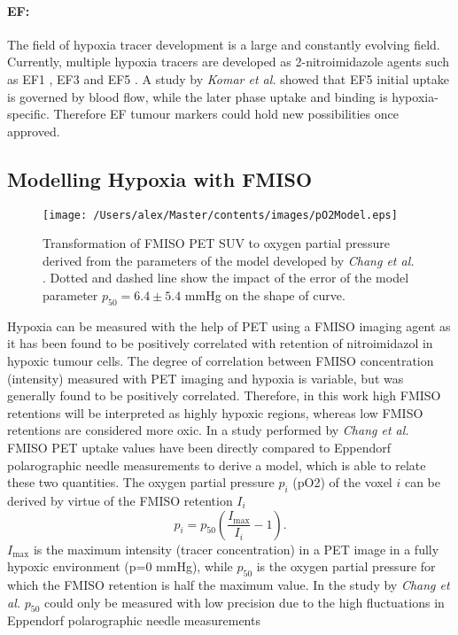 \paragraph{EF: }The field of hypoxia tracer development is a large and constantly evolving field. Currently, multiple hypoxia tracers are developed as 2-nitroimidazole agents such as EF1 \cite{pmid10688119}, EF3 \cite{pmid17334763} and EF5 \cite{pmid12552344}. A study by \textit{Komar et al.} \cite{pmid18997048} showed that EF5 initial uptake is governed by blood flow, while the later phase uptake and binding is hypoxia-specific. Therefore EF tumour markers could hold new possibilities once approved.
\subsection{Modelling Hypoxia with FMISO}
\begin{figure}[htb]
\centering
\texttt{[image: /Users/alex/Master/contents/images/pO2Model.eps]}
\vspace{1cm}
\caption{Transformation of FMISO PET SUV to oxygen partial pressure derived from the parameters of the model developed by \textit{Chang et al.}\cite{pmid19994538} . Dotted and dashed line show the impact of the error of the model parameter $p_{50} = 6.4 \pm 5.4$ mmHg on the shape of curve.}
\label{fig:pO2Model}
\end{figure}
Hypoxia can be measured with the help of PET using a FMISO imaging agent as it has been found to be positively correlated with retention of nitroimidazol in hypoxic tumour cells. The degree of correlation between FMISO concentration (intensity) measured with PET imaging and hypoxia is variable, but was generally found to be positively correlated. Therefore, in this work high FMISO retentions will be interpreted as highly hypoxic regions, whereas low FMISO retentions are considered more oxic. In a study performed by \textit{Chang et al.} \cite{pmid19994538} FMISO PET uptake values have been directly compared to Eppendorf polarographic needle measurements to derive a model, which is able to relate these two quantities. The oxygen partial pressure $p_i$ (pO2) of the voxel $i$ can be derived by virtue of the FMISO retention $I_i$
\begin{equation}\label{eq:changmodel}
p_i = p_\mathrm{50}\left(\frac{I_\mathrm{max}}{I_i}-1\right).
\end{equation}
$I_\mathrm{max}$ is the maximum intensity (tracer concentration) in a PET image in a fully hypoxic environment (p=0 mmHg), while $p_\mathrm{50}$ is the oxygen partial pressure for which the FMISO retention is half the maximum value. In the study by \textit{Chang et al.} \cite{pmid19994538} $p_\mathrm{50}$ could only be measured with low precision due to the high fluctuations in Eppendorf polarographic needle measurements

